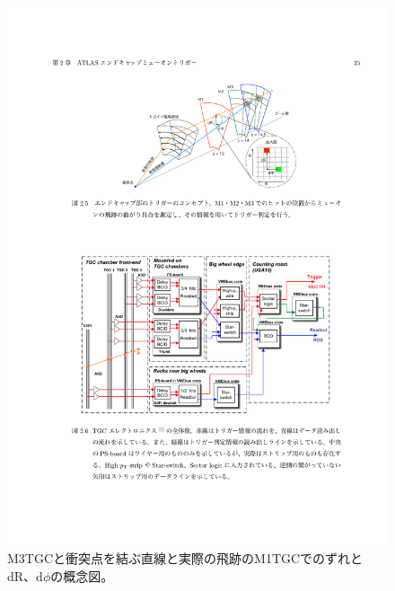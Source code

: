 \begin{figure}[h]
  \centering
  \includegraphics[clip, width=12cm]{fig/3/akatsuka_mt_trigger_scheme.pdf}
  \caption{M3TGCと衝突点を結ぶ直線と実際の飛跡のM1TGCでのずれとdR、d$\phi$の概念図\cite{article:akatsuka}。}
  \label{fig:3-4}
\end{figure}

